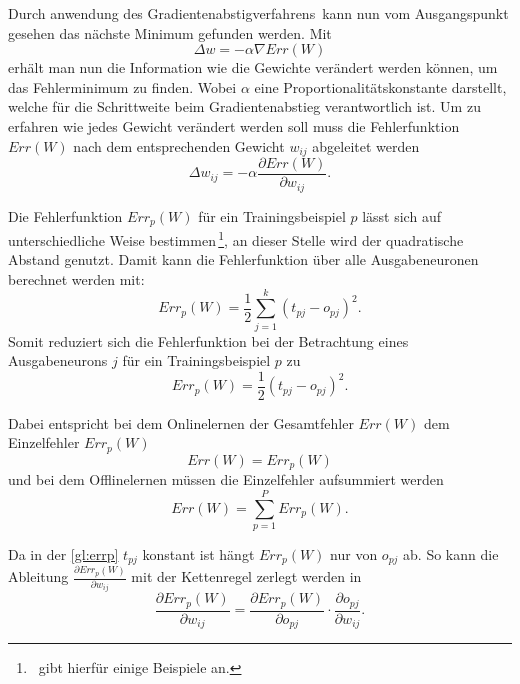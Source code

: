 
Durch anwendung des Gradientenabstigverfahrens\, kann nun vom Ausgangspunkt gesehen das nächste Minimum gefunden werden. Mit
\begin{equation}
\Delta w = - \alpha \nabla Err(W)
\end{equation}
erhält man nun die Information wie die Gewichte verändert werden können, um das Fehlerminimum zu finden.
Wobei $\alpha$ eine Proportionalitätskonstante darstellt, welche für die Schrittweite beim Gradientenabstieg verantwortlich ist.
Um zu erfahren wie jedes Gewicht verändert werden soll muss die Fehlerfunktion $Err(W)$ nach dem entsprechenden Gewicht $w_{ij}$ abgeleitet werden
\begin{equation}
\Delta w_{ij} = - \alpha \frac{\partial Err(W)}{\partial w_{ij}} .
\label{gl:gewaend}
\end{equation}

Die Fehlerfunktion $Err_p(W)$ für ein Trainingsbeispiel $p$ lässt sich auf unterschiedliche Weise bestimmen\,\footnote{\,\citet[60 f]{dkriesel07} gibt hierfür einige Beispiele an.}, an dieser Stelle wird der quadratische Abstand genutzt. Damit kann die Fehlerfunktion über alle Ausgabeneuronen berechnet werden mit:
\begin{equation}
Err_p(W)= \frac{1}{2} \sum^k_{j=1} (t_{pj}-o_{pj})^2 .
\end{equation}
Somit reduziert sich die Fehlerfunktion bei der Betrachtung eines Ausgabeneurons $j$ für ein Trainingsbeispiel $p$ zu
\begin{equation}
Err_p(W)= \frac{1}{2} (t_{pj}-o_{pj})^2 .
\label{gl:errp}
\end{equation}


Dabei entspricht bei dem Onlinelernen der Gesamtfehler $Err(W)$ dem Einzelfehler $Err_p(W)$
\begin{equation}
Err(W)=Err_p(W) 
\end{equation}
und bei dem Offlinelernen müssen die Einzelfehler aufsummiert werden
\begin{equation}
Err(W)= \sum^P_{p=1} Err_p(W). 
\end{equation}

Da in der \autoref{gl:errp} $t_{pj}$ konstant ist hängt $Err_p(W)$ nur von $o_{pj}$ ab. So kann die Ableitung $\frac{\partial Err_p(W)}{\partial w_{ij}}$ mit der Kettenregel zerlegt werden in
\begin{equation}
\frac{\partial Err_p(W)}{\partial w_{ij}}= \frac{\partial Err_p(W)}{\partial o_{pj}} \cdot \frac{\partial o_{pj}}{\partial w_{ij}}.
\label{gl:zerlket}
\end{equation}

